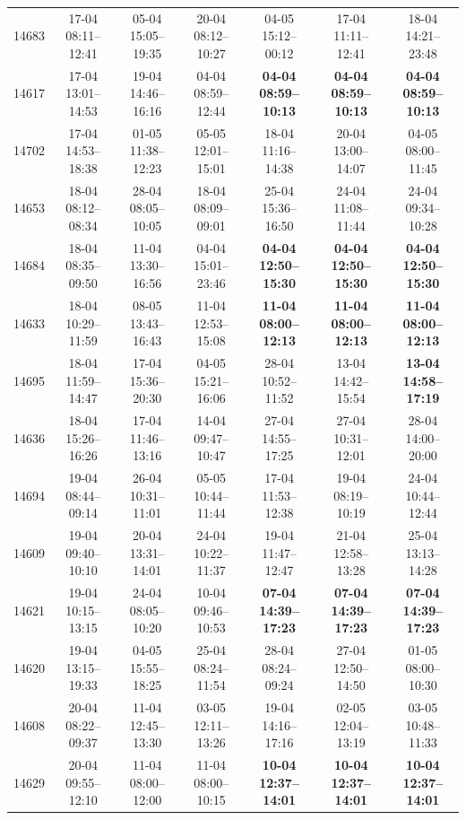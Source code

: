 \begin{table}[htbp]
\begin{tabular}{|r|c|c|c|c|c|c|}
14683 & 17-04 08:11--12:41 & 05-04 15:05--19:35 & 20-04 08:12--10:27 & 04-05 15:12--00:12 & 17-04 11:11--12:41 & 18-04 14:21--23:48 \\ 
14617 & 17-04 13:01--14:53 & 19-04 14:46--16:16 & 04-04 08:59--12:44 & \textbf{04-04 08:59--10:13} & \textbf{04-04 08:59--10:13} & \textbf{04-04 08:59--10:13} \\ 
14702 & 17-04 14:53--18:38 & 01-05 11:38--12:23 & 05-05 12:01--15:01 & 18-04 11:16--14:38 & 20-04 13:00--14:07 & 04-05 08:00--11:45 \\ 
14653 & 18-04 08:12--08:34 & 28-04 08:05--10:05 & 18-04 08:09--09:01 & 25-04 15:36--16:50 & 24-04 11:08--11:44 & 24-04 09:34--10:28 \\ 
14684 & 18-04 08:35--09:50 & 11-04 13:30--16:56 & 04-04 15:01--23:46 & \textbf{04-04 12:50--15:30} & \textbf{04-04 12:50--15:30} & \textbf{04-04 12:50--15:30} \\ 
14633 & 18-04 10:29--11:59 & 08-05 13:43--16:43 & 11-04 12:53--15:08 & \textbf{11-04 08:00--12:13} & \textbf{11-04 08:00--12:13} & \textbf{11-04 08:00--12:13} \\ 
14695 & 18-04 11:59--14:47 & 17-04 15:36--20:30 & 04-05 15:21--16:06 & 28-04 10:52--11:52 & 13-04 14:42--15:54 & \textbf{13-04 14:58--17:19} \\ 
14636 & 18-04 15:26--16:26 & 17-04 11:46--13:16 & 14-04 09:47--10:47 & 27-04 14:55--17:25 & 27-04 10:31--12:01 & 28-04 14:00--20:00 \\ 
14694 & 19-04 08:44--09:14 & 26-04 10:31--11:01 & 05-05 10:44--11:44 & 17-04 11:53--12:38 & 19-04 08:19--10:19 & 24-04 10:44--12:44 \\ 
14609 & 19-04 09:40--10:10 & 20-04 13:31--14:01 & 24-04 10:22--11:37 & 19-04 11:47--12:47 & 21-04 12:58--13:28 & 25-04 13:13--14:28 \\ 
14621 & 19-04 10:15--13:15 & 24-04 08:05--10:20 & 10-04 09:46--10:53 & \textbf{07-04 14:39--17:23} & \textbf{07-04 14:39--17:23} & \textbf{07-04 14:39--17:23} \\ 
14620 & 19-04 13:15--19:33 & 04-05 15:55--18:25 & 25-04 08:24--11:54 & 28-04 08:24--09:24 & 27-04 12:50--14:50 & 01-05 08:00--10:30 \\ 
14608 & 20-04 08:22--09:37 & 11-04 12:45--13:30 & 03-05 12:11--13:26 & 19-04 14:16--17:16 & 02-05 12:04--13:19 & 03-05 10:48--11:33 \\ 
14629 & 20-04 09:55--12:10 & 11-04 08:00--12:00 & 11-04 08:00--10:15 & \textbf{10-04 12:37--14:01} & \textbf{10-04 12:37--14:01} & \textbf{10-04 12:37--14:01} \\ 

\end{tabular}
\end{table}
